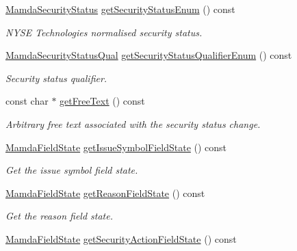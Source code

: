 \begin{CompactItemize}
\hyperlink{namespaceWombat_073e683b7aeffa26cf3d2791dda32b4b}{Mamda\-Security\-Status} \hyperlink{classWombat_1_1MamdaSecStatusListener_2cff8818f54794f33a5b0a697bd8215a}{get\-Security\-Status\-Enum} () const 
\begin{CompactList}\small\item\em NYSE Technologies normalised security status. \item\end{CompactList}\item 
\hyperlink{namespaceWombat_2de6f22c731ba94169dc24b8054862b8}{Mamda\-Security\-Status\-Qual} \hyperlink{classWombat_1_1MamdaSecStatusListener_23df8eda9a22fae28680615ce0de4a0f}{get\-Security\-Status\-Qualifier\-Enum} () const 
\begin{CompactList}\small\item\em Security status qualifier. \item\end{CompactList}\item 
const char $\ast$ \hyperlink{classWombat_1_1MamdaSecStatusListener_cfc40e59afe20f90ea1c0aa616397882}{get\-Free\-Text} () const 
\begin{CompactList}\small\item\em Arbitrary free text associated with the security status change. \item\end{CompactList}\item 
\hyperlink{namespaceWombat_93aac974f2ab713554fd12a1fa3b7d2a}{Mamda\-Field\-State} \hyperlink{classWombat_1_1MamdaSecStatusListener_bfbb5289809053bd0864dbbec9f40edf}{get\-Issue\-Symbol\-Field\-State} () const 
\begin{CompactList}\small\item\em Get the issue symbol field state. \item\end{CompactList}\item 
\hyperlink{namespaceWombat_93aac974f2ab713554fd12a1fa3b7d2a}{Mamda\-Field\-State} \hyperlink{classWombat_1_1MamdaSecStatusListener_b24a32e99973888050277f1cac1a23f5}{get\-Reason\-Field\-State} () const 
\begin{CompactList}\small\item\em Get the reason field state. \item\end{CompactList}\item 
\hyperlink{namespaceWombat_93aac974f2ab713554fd12a1fa3b7d2a}{Mamda\-Field\-State} \hyperlink{classWombat_1_1MamdaSecStatusListener_3a220f61dbc73b122840f7f3986d2b9c}{get\-Security\-Action\-Field\-State} () const 

\end{CompactItemize}
